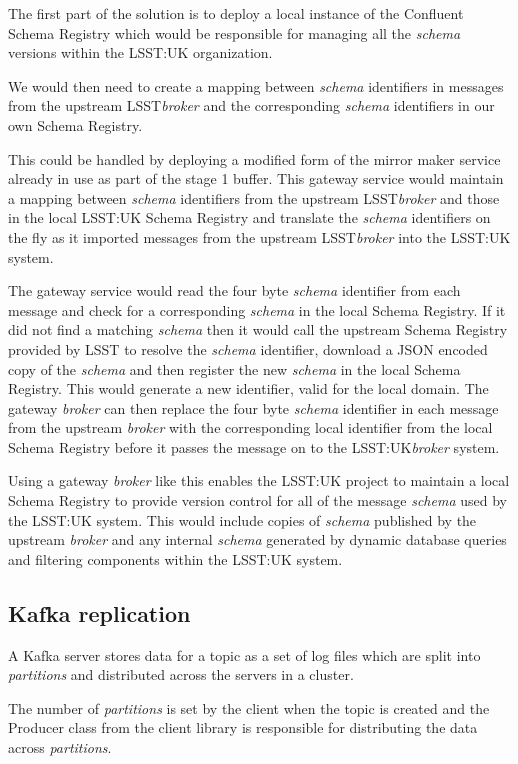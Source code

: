 \documentclass{article}
\newcommand{\json} {JSON\xspace}
\newcommand{\kafka} {Kafka\xspace}
\newcommand{\kfbroker} {\textit{broker}\xspace}
\newcommand{\kfpartitions} {\textit{partitions}\xspace}
\newcommand{\confluent} {Confluent\xspace}
\newcommand{\avschema} {\textit{schema}\xspace}
\newcommand{\conschemaregistry} {Schema Registry\xspace}
\newcommand{\stageone} {stage 1\xspace}
\newcommand{\lsst} {LSST\xspace}
\newcommand{\lsstuk} {LSST:UK\xspace}
\newcommand{\javaname}[1] {{\ttfamily\color{codeblue} #1}}
\begin{document}
The first part of the solution is to deploy a local instance of the \confluent \conschemaregistry which would be responsible for managing all the \avschema versions within the \lsstuk organization.

We would then need to create a mapping between \avschema identifiers in messages from the upstream \lsst \kfbroker and the corresponding \avschema identifiers in our own \conschemaregistry.

This could be handled by deploying a modified form of the mirror maker service already in use as part of the \stageone buffer.
This gateway service would maintain a mapping between \avschema identifiers from the upstream \lsst \kfbroker and those in the local \lsstuk \conschemaregistry and translate the \avschema identifiers on the fly as it imported messages from the upstream \lsst \kfbroker into the \lsstuk system.

The gateway service would read the four byte \avschema identifier from each message and check for a corresponding \avschema in the local \conschemaregistry. If it did not find a matching \avschema then it would call the upstream \conschemaregistry provided by \lsst to resolve the \avschema identifier, download a \json encoded copy of the \avschema and then register the new \avschema in the local \conschemaregistry. This would generate a new identifier, valid for the local domain.
The gateway \kfbroker can then replace the four byte \avschema identifier in each message from the upstream \kfbroker with the corresponding local identifier from the local \conschemaregistry before it passes the message on to the \lsstuk \kfbroker system.

Using a gateway \kfbroker like this enables the \lsstuk project to maintain a local \conschemaregistry to provide version control for all of the message \avschema used by the \lsstuk system. This would include copies of \avschema published by the upstream \kfbroker and any internal \avschema generated by dynamic database queries and filtering components within the \lsstuk system.

\subsection{Kafka replication}
\label{kafka-data-storage}

A \kafka server stores data for a topic as a set of log files which are split into \kfpartitions and distributed across the servers in a cluster.

The number of \kfpartitions is set by the client when the topic is created and the \javaname{Producer} class from the client library is responsible for distributing the data across \kfpartitions.
\end{document}
